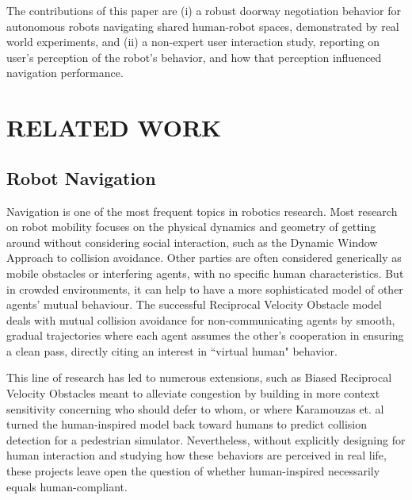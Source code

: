 \documentclass[letterpaper, 10 pt, conference]{ieeeconf}  %
\begin{document}
The contributions of this paper are (i) a robust doorway negotiation behavior for autonomous robots navigating shared human-robot spaces, demonstrated by real world experiments, and (ii) a non-expert user interaction study, reporting on user's perception of the robot’s behavior, and how that perception influenced navigation performance.

\section{RELATED WORK}


\subsection{Robot Navigation}

Navigation is one of the most frequent topics in robotics research. Most research on robot mobility focuses on the physical dynamics and geometry of getting around without considering social interaction, such as the Dynamic Window Approach to collision avoidance\cite{fox1997dynamic}. Other parties are often considered generically as mobile obstacles or interfering agents, with no specific human characteristics. But in crowded environments, it can help to have a more sophisticated model of other agents' mutual behaviour. The successful Reciprocal Velocity Obstacle model\cite{van2008reciprocal} deals with mutual collision avoidance for non-communicating agents by smooth, gradual trajectories where each agent assumes the other’s cooperation in ensuring a clean pass, directly citing an interest in ``virtual human" behavior. 

This line of research has led to numerous extensions, such as Biased Reciprocal Velocity Obstacles\cite{sadat2012bravo} meant to alleviate congestion by building in more context sensitivity concerning who should defer to whom, or where Karamouzas et. al\cite{karamouzas2009predictive} turned the human-inspired model back toward humans to predict collision detection for a pedestrian simulator. Nevertheless, without explicitly designing for human interaction and studying how these behaviors are perceived in real life, these projects leave open the question of whether human-inspired necessarily equals human-compliant.
\end{document}
